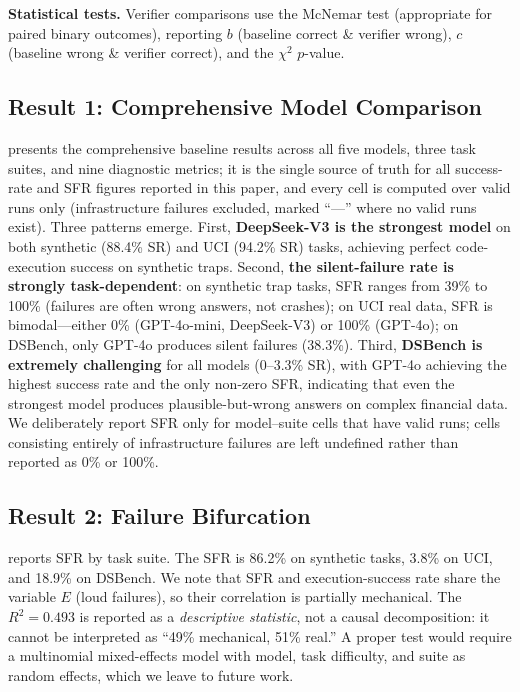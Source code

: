 \textbf{Statistical tests.} Verifier comparisons use the McNemar test (appropriate for paired binary outcomes), reporting $b$ (baseline correct \& verifier wrong), $c$ (baseline wrong \& verifier correct), and the $\chi^2$ $p$-value.

\subsection{Result 1: Comprehensive Model Comparison}
\label{sec:res-models}



 presents the comprehensive baseline results across all five models, three task suites, and nine diagnostic metrics; it is the single source of truth for all success-rate and SFR figures reported in this paper, and every cell is computed over valid runs only (infrastructure failures excluded, marked ``---'' where no valid runs exist). Three patterns emerge. First, \textbf{DeepSeek-V3 is the strongest model} on both synthetic (88.4\% SR) and UCI (94.2\% SR) tasks, achieving perfect code-execution success on synthetic traps. Second, \textbf{the silent-failure rate is strongly task-dependent}: on synthetic trap tasks, SFR ranges from 39\% to 100\% (failures are often wrong answers, not crashes); on UCI real data, SFR is bimodal---either 0\% (GPT-4o-mini, DeepSeek-V3) or 100\% (GPT-4o); on DSBench, only GPT-4o produces silent failures (38.3\%). Third, \textbf{DSBench is extremely challenging} for all models (0--3.3\% SR), with GPT-4o achieving the highest success rate and the only non-zero SFR, indicating that even the strongest model produces plausible-but-wrong answers on complex financial data. We deliberately report SFR only for model--suite cells that have valid runs; cells consisting entirely of infrastructure failures are left undefined rather than reported as 0\% or 100\%.

\subsection{Result 2: Failure Bifurcation}
\label{sec:res-bifurcation}



 reports SFR by task suite. The SFR is 86.2\% on synthetic tasks, 3.8\% on UCI, and 18.9\% on DSBench. We note that SFR and execution-success rate share the variable $E$ (loud failures), so their correlation is partially mechanical. The $R^2 = 0.493$ is reported as a \emph{descriptive statistic}, not a causal decomposition: it cannot be interpreted as ``49\% mechanical, 51\% real.'' A proper test would require a multinomial mixed-effects model with model, task difficulty, and suite as random effects, which we leave to future work.

